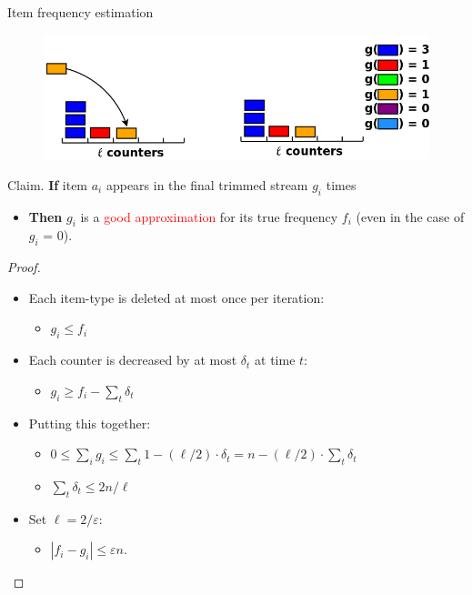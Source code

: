\documentclass[first=dgreen,second=purple,logo=redque]{aaltoslides}
\begin{document}
\begin{frame}[allowframebreaks=1]{Item frequency estimation}
\framebreak

\begin{figure}
  \includegraphics[scale=0.3]{plots/fi6}
 \label{fig:fi5}
\end{figure}

\textcolor{dgreen}{Claim.} \textbf{If} item $a_{i}$ appears in the \textcolor{dgreen}{final} trimmed
stream $g_{i}$ times
\begin{itemize}
  \item \textbf{Then} $g_{i}$ is a \textcolor{red}{good approximation} for its
  true frequency $f_{i}$ (even in the case of $g_{i}$ = 0).
\end{itemize}         

\framebreak

\begin{proof}
\begin{itemize}
	\item Each item-type is deleted \textcolor{dgreen}{at most} once per iteration:
		\begin{itemize}\item $g_{i} \leq f_{i}$\end{itemize}
	\item Each counter is decreased by at most $\delta_{t}$ at time $t$:
		\begin{itemize}\item $g_{i} \geq f_{i} - \sum_{t} \delta_{t}$\end{itemize}
	\item Putting this together:
		\begin{itemize}
			\item $0 \leq \sum_{i}g_{i} \leq \sum_{t} 1 - (\ell/2)
				\cdot \delta_{t} = n - (\ell/2) \cdot \sum_{t} \delta_{t}$
			\item $\sum_{t} \delta_{t} \leq 2n/\ell$
		\end{itemize}
	\item Set $\ell = 2/\varepsilon$:
		\begin{itemize}\item $|f_{i} - g_{i}| \leq \varepsilon n$.\end{itemize}
\end{itemize}
\end{proof}


\end{frame}
\end{document}
